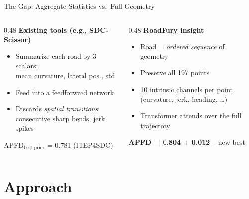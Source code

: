 \documentclass[aspectratio=169,10pt]{beamer}
\newcommand{\hlg}[1]{\textcolor{successgreen}{\textbf{#1}}}
\newcommand{\hlr}[1]{\textcolor{alertred}{\textbf{#1}}}
\begin{document}
\begin{frame}{The Gap: Aggregate Statistics vs.\ Full Geometry}
  \begin{columns}[T]
    \begin{column}{0.48\linewidth}
      \textbf{\hlr{Existing tools (e.g., SDC-Scissor)}}
      \vspace{4pt}
      \begin{itemize}
        \item Summarize each road by 3 scalars:\\
              mean curvature, lateral pos., std
        \item Feed into a feedforward network
        \item Discards \emph{spatial transitions}:\\
              consecutive sharp bends, jerk spikes
      \end{itemize}
      \vspace{10pt}
      {\small APFD$_\text{best prior}$ = 0.781 (ITEP4SDC)}
    \end{column}
    \begin{column}{0.48\linewidth}
      \textbf{\hlg{RoadFury insight}}
      \vspace{4pt}
      \begin{itemize}
        \item Road = \emph{ordered sequence} of geometry
        \item Preserve all 197 points
        \item 10 intrinsic channels per point\\
              (curvature, jerk, heading, \ldots)
        \item Transformer attends over the full trajectory
      \end{itemize}
      \vspace{10pt}
      {\small \hlg{APFD = 0.804 $\pm$ 0.012} -- new best}
    \end{column}
  \end{columns}
\end{frame}

\section{Approach}
\end{document}
